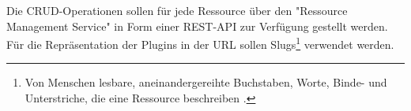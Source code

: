 Die CRUD-Operationen sollen für jede Ressource über den "Ressource Management Service"
in Form einer REST-API zur Verfügung gestellt werden. Für die Repräsentation der Plugins
in der URL sollen Slugs\footnote{Von Menschen lesbare, aneinandergereihte Buchstaben, Worte, Binde- und Unterstriche,
die eine Ressource beschreiben \cite{SlugTermDjango}.} verwendet werden.
